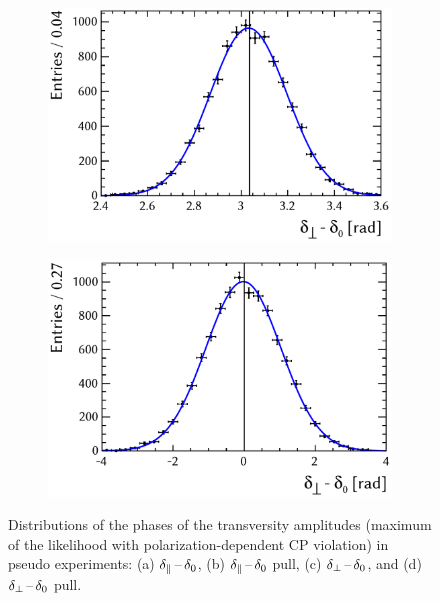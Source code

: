 \begin{figure}[tbp]
  \vspace*{0.02\textwidth}
  \begin{subfigure}{0.49\textwidth}
    \includegraphics[width=\textwidth]{graphics/results/parDist_polarDep_AperpPhase}
    \caption{}
  \end{subfigure}
  \hfill%
  \begin{subfigure}{0.49\textwidth}
    \includegraphics[width=\textwidth]{graphics/results/pullDist_polarDep_AperpPhase}
    \caption{}
  \end{subfigure}

  \caption{Distributions of the phases of the transversity amplitudes (maximum of the likelihood with polarization-dependent CP violation)
           in pseudo experiments:
           (a) $\delta_\parallel\,\text{--}\,\delta_\text{0}$, (b) $\delta_\parallel\,\text{--}\,\delta_\text{0}$ pull, (c) $\delta_\perp\,\text{--}\,\delta_\text{0}$, and (d) $\delta_\perp\,\text{--}\,\delta_\text{0}$ pull.}
  \label{fig:parDists_parperpPhases}
\end{figure}

